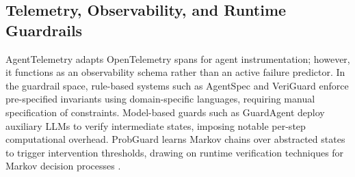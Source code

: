 \documentclass[journal,compsoc]{IEEEtran}
\begin{document}
\subsection{Telemetry, Observability, and Runtime Guardrails}
AgentTelemetry \cite{balusu2026agenttelemetry} adapts OpenTelemetry spans for agent instrumentation; however, it functions as an observability schema rather than an active failure predictor. In the guardrail space, rule-based systems such as AgentSpec \cite{wang2025agentspec} and VeriGuard \cite{miculicich2025veriguard} enforce pre-specified invariants using domain-specific languages, requiring manual specification of constraints. Model-based guards such as GuardAgent \cite{xiang2025guardagent} deploy auxiliary LLMs to verify intermediate states, imposing notable per-step computational overhead. ProbGuard \cite{wang2025probguard} learns Markov chains over abstracted states to trigger intervention thresholds, drawing on runtime verification techniques for Markov decision processes \cite{junges2021runtime, zhou2022runtime}.
\end{document}
